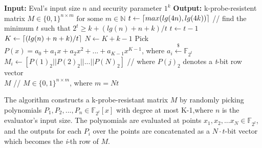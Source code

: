 \documentclass{article}
\DeclarePairedDelimiter{\ceil}{\lceil}{\rceil}
\begin{document}
\begin{algorithm}
\label{k-probe-matrix}
\begin{algorithmic}
\State \textbf{Input:} Eval's input size $n$ and security parameter $1^{k}$
\State \textbf{Output:} k-probe-resistent matrix $M \in \{0,1\}^{n \times m} \text{ for some } m \in \mathbb{N}$
\State $t \leftarrow \ceil{max(lg(4n),lg(4k))}$ // find the minimum $t$ such that $2^{t} \geq k + (lg(n) + n + k)/t$
	\State $t \leftarrow t - 1$
\EndWhile
\State $K \leftarrow \ceil{(lg(n) + n + k)/t}$
\State $N \leftarrow K + k - 1$
	\State Pick $P(x) = a_{0} + a_{1}x + a_{2}x^{2} + ... + a_{K-1}x^{K-1}$, where $a_{i} \xleftarrow{\$} \mathbb{F}_{2^{t}}$
	\State $M_{i} \leftarrow [P(1)_{2} || P(2)_{2} || ... || P(N)_{2}]$ // where $P(j)_{2}$ denotes a \emph{t}-bit row vector
\EndFor \\ 
\Return $M$ // $M \in \{0,1\}^{n \times m}$, where $m=Nt$
\end{algorithmic}
\end{algorithm}

The algorithm constructs a k-probe-resistant matrix $M$ by randomly picking polynomials $P_1,P_2,...,P_n \in \mathbb{F}_{2^{t}}[x]$ with degree at most K-1,where $n$ is the evaluator's input size. The polynomials are evaluated at points $x_1,x_2,...x_N \in \mathbb{F}_{2^{t}}$,  and the outputs for each $P_i$ over the points are concatenated as a $N \cdot t$-bit vector which becomes the \emph{i}-th row of $M$.

% 
%
\end{document}
